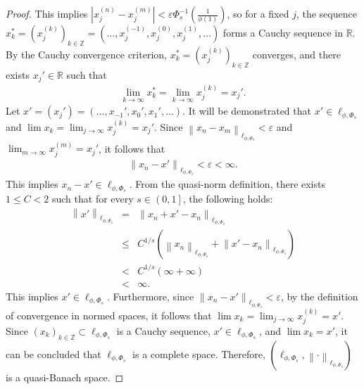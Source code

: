 \documentclass[12pt,a4paper]{article}
\theoremstyle{remark}
\begin{document}
\begin{proof}
    This implies $\left|x_j^{(n)} - x_j^{(m)}\right| < \varepsilon \Phi_s^{-1}\left(\frac{1}{\phi(1)}\right)$, so for a fixed $j$, the sequence $x_k^* = \left(x_j^{(k)}\right)_{k \in \mathbb{Z}} = \left(\ldots, x_j^{(-1)}, x_j^{(0)}, x_j^{(1)}, \ldots\right)$ forms a Cauchy sequence in $\mathbb{R}$. By the Cauchy convergence criterion, $x_k^* = \left(x_j^{(k)}\right)_{k \in \mathbb{Z}}$ converges, and there exists $x_j' \in \mathbb{R}$ such that
    \begin{eqnarray*}
        \lim_{k \to \infty} x_k^* = \lim_{k \to \infty} x_j^{(k)} = x_j'.
    \end{eqnarray*}
    Let $x' = \left(x_j'\right) = \left(\ldots, x_{-1}', x_0', x_1', \ldots\right)$. It will be demonstrated that $x' \in \ell_{\phi, \Phi_s}$ and $\lim x_k = \lim_{j \to \infty} x_j^{(k)} = x_j'$. Since $\left\lVert x_n - x_m \right\rVert_{\ell_{\phi, \Phi_s}} < \varepsilon$ and $\lim_{m \to \infty} x_j^{(m)} = x_j'$, it follows that
    \begin{eqnarray*}
        \left\lVert x_n - x' \right\rVert_{\ell_{\phi, \Phi_s}} < \varepsilon < \infty.
    \end{eqnarray*}
    This implies $x_n - x' \in \ell_{\phi, \Phi_s}$. From the quasi-norm definition, there exists $1 \leq C < 2$ such that for every $s \in \left(0, 1\right]$, the following holds:
    \begin{eqnarray*}
        \left\lVert x' \right\rVert_{\ell_{\phi, \Phi_s}} &=& \left\lVert x_n + x' - x_n \right\rVert_{\ell_{\phi, \Phi_s}}\\
        &\leq& C^{1/s} \left(\left\lVert x_n \right\rVert_{\ell_{\phi, \Phi_s}} + \left\lVert x' - x_n \right\rVert_{\ell_{\phi, \Phi_s}}\right)\\
        &<& C^{1/s} \left(\infty + \infty\right)\\
        &<& \infty.
    \end{eqnarray*}
    This implies $x' \in \ell_{\phi, \Phi_s}$. Furthermore, since $\left\lVert x_n - x' \right\rVert_{\ell_{\phi, \Phi_s}} < \varepsilon$, by the definition of convergence in normed spaces, it follows that $\lim x_k = \lim_{j \to \infty} x_j^{(k)} = x'$. Since $\left(x_k\right)_{k \in \mathbb{Z}} \subset \ell_{\phi, \Phi_s}$ is a Cauchy sequence, $x' \in \ell_{\phi, \Phi_s}$, and $\lim x_k = x'$, it can be concluded that $\ell_{\phi, \Phi_s}$ is a complete space. Therefore, $\left(\ell_{\phi, \Phi_s}, \left\lVert \cdot \right\rVert_{\ell_{\phi, \Phi_s}}\right)$ is a quasi-Banach space.
\end{proof}
\end{document}
